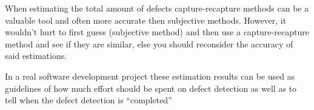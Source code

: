 When estimating the total amount of defects capture-recapture methods can be a valuable tool and often more accurate then subjective methods. However, it wouldn't hurt to first guess (subjective method) and then use a capture-recapture method and see if they are similar, else you should reconsider the accuracy of said estimations.

In a real software development project these estimation results can be used as guidelines of how much effort should be spent on defect detection as well as to tell when the defect detection is "`completed"'
